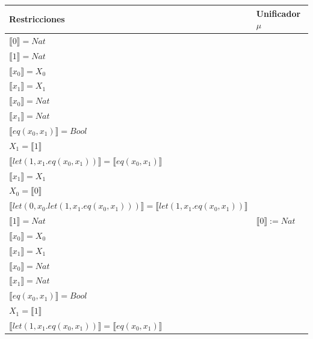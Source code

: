 \begin{exercise}
\begin{description}
                \begin{center}
                    \begin{longtable}{ | l | l | } 
                      \hline
                      Restricciones & Unificador $\mu$ \\ 
                        \hline
                        $ \llbracket 0 \rrbracket = Nat$  & \\
                        $ \llbracket 1 \rrbracket = Nat$  & \\
                        $ \llbracket x_0 \rrbracket = X_0$ & \\
                        $ \llbracket x_1 \rrbracket = X_1$  & \\
                        $ \llbracket x_0 \rrbracket = Nat$  & \\
		   $ \llbracket x_1 \rrbracket = Nat$  & \\
                        $ \llbracket eq(x_0,x_1) \rrbracket = Bool$  & \\
                        $X_1 =  \llbracket 1 \rrbracket$ & \\
                        $ \llbracket let(1,x_1.eq(x_0,x_1)) \rrbracket =  \llbracket eq(x_0,x_1) \rrbracket$  & \\
                        $ \llbracket x_1 \rrbracket = X_1$  & \\
                        $X_0=  \llbracket 0 \rrbracket$ & \\
                        $ \llbracket let(0,x_0.let(1,x_1.eq(x_0,x_1))) \rrbracket =  \llbracket let(1,x_1.eq(x_0,x_1)) \rrbracket$ & \\
                      \hline
                        $ \llbracket 1 \rrbracket = Nat$  & $ \llbracket 0 \rrbracket := Nat$  \\
                        $ \llbracket x_0 \rrbracket = X_0$ & \\
                        $ \llbracket x_1 \rrbracket = X_1$  & \\
                        $ \llbracket x_0 \rrbracket = Nat$  & \\
		   $ \llbracket x_1 \rrbracket = Nat$  & \\
                        $ \llbracket eq(x_0,x_1) \rrbracket = Bool$  & \\
                        $X_1 =  \llbracket 1 \rrbracket$ & \\
                        $ \llbracket let(1,x_1.eq(x_0,x_1)) \rrbracket =  \llbracket eq(x_0,x_1) \rrbracket$  & \\

\end{longtable}
\end{center}
\end{description}
\end{exercise}
